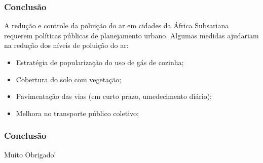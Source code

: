 \begin{frame}
  \frametitle{Conclusão}
  A redução e controle da poluição do ar em cidades da África Subsariana requerem políticas públicas de planejamento urbano. Algumas medidas ajudariam na redução dos níveis de poluição do ar:
  \begin{itemize}
    \item Estratégia de popularização do uso de gás de cozinha;
    \item Cobertura do solo com vegetação;
    \item Pavimentação das vias (em curto prazo, umedecimento diário);
    \item Melhora no transporte público coletivo;
  \end{itemize}
\end{frame}



\begin{frame}
  \frametitle{Conclusão}
  \begin{center}
    Muito Obrigado!
  \end{center}
\end{frame}

